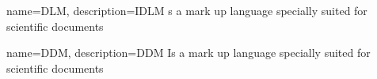 {
    name=DLM,
    description={IDLM s a mark up language specially suited 
    for scientific documents}
}

{
    name=DDM,
    description={DDM Is a mark up language specially suited 
    for scientific documents}
}
